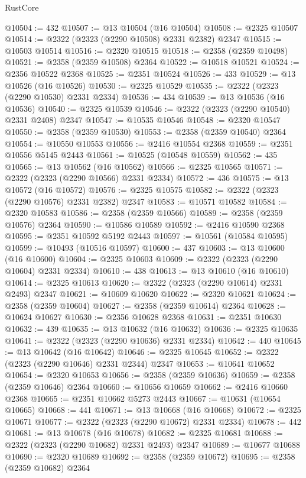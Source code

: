 \begin{lexlean}{RustCore}
\begin{coremodule}
@10504 := 432
@10507 := @13 @10504 (@16 @10504)
@10508 := @2325 @10507
@10514 := @2322 (@2323 (@2290 @10508) @2331 @2382) @2347
@10515 := @10503 @10514
@10516 := @2320 @10515
@10518 := @2358 (@2359 @10498)
@10521 := @2358 (@2359 @10508) @2364
@10522 := @10518 @10521
@10524 := @2356 @10522 @2368
@10525 := @2351 @10524
@10526 := 433
@10529 := @13 @10526 (@16 @10526)
@10530 := @2325 @10529
@10535 := @2322 (@2323 (@2290 @10530) @2331 @2334)
@10536 := 434
@10539 := @13 @10536 (@16 @10536)
@10540 := @2325 @10539
@10546 := @2322 (@2323 (@2290 @10540) @2331 @2408) @2347
@10547 := @10535 @10546
@10548 := @2320 @10547
@10550 := @2358 (@2359 @10530)
@10553 := @2358 (@2359 @10540) @2364
@10554 := @10550 @10553
@10556 := @2416 @10554 @2368
@10559 := @2351 @10556 @5145 @2443
@10561 := @10525 (@10548 @10559)
@10562 := 435
@10565 := @13 @10562 (@16 @10562)
@10566 := @2325 @10565
@10571 := @2322 (@2323 (@2290 @10566) @2331 @2334)
@10572 := 436
@10575 := @13 @10572 (@16 @10572)
@10576 := @2325 @10575
@10582 := @2322 (@2323 (@2290 @10576) @2331 @2382) @2347
@10583 := @10571 @10582
@10584 := @2320 @10583
@10586 := @2358 (@2359 @10566)
@10589 := @2358 (@2359 @10576) @2364
@10590 := @10586 @10589
@10592 := @2416 @10590 @2368
@10595 := @2351 @10592 @5192 @2443
@10597 := @10561 (@10584 @10595)
@10599 := @10493 (@10516 @10597)
@10600 := 437
@10603 := @13 @10600 (@16 @10600)
@10604 := @2325 @10603
@10609 := @2322 (@2323 (@2290 @10604) @2331 @2334)
@10610 := 438
@10613 := @13 @10610 (@16 @10610)
@10614 := @2325 @10613
@10620 := @2322 (@2323 (@2290 @10614) @2331 @2493) @2347
@10621 := @10609 @10620
@10622 := @2320 @10621
@10624 := @2358 (@2359 @10604)
@10627 := @2358 (@2359 @10614) @2364
@10628 := @10624 @10627
@10630 := @2356 @10628 @2368
@10631 := @2351 @10630
@10632 := 439
@10635 := @13 @10632 (@16 @10632)
@10636 := @2325 @10635
@10641 := @2322 (@2323 (@2290 @10636) @2331 @2334)
@10642 := 440
@10645 := @13 @10642 (@16 @10642)
@10646 := @2325 @10645
@10652 := @2322 (@2323 (@2290 @10646) @2331 @2344) @2347
@10653 := @10641 @10652
@10654 := @2320 @10653
@10656 := @2358 (@2359 @10636)
@10659 := @2358 (@2359 @10646) @2364
@10660 := @10656 @10659
@10662 := @2416 @10660 @2368
@10665 := @2351 @10662 @5273 @2443
@10667 := @10631 (@10654 @10665)
@10668 := 441
@10671 := @13 @10668 (@16 @10668)
@10672 := @2325 @10671
@10677 := @2322 (@2323 (@2290 @10672) @2331 @2334)
@10678 := 442
@10681 := @13 @10678 (@16 @10678)
@10682 := @2325 @10681
@10688 := @2322 (@2323 (@2290 @10682) @2331 @2493) @2347
@10689 := @10677 @10688
@10690 := @2320 @10689
@10692 := @2358 (@2359 @10672)
@10695 := @2358 (@2359 @10682) @2364

\end{coremodule}
\end{lexlean}
